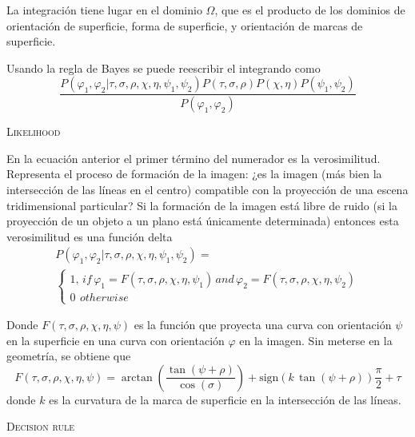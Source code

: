 \documentclass[a4paper,12pt]{article}
\begin{document}
La integración tiene lugar en el dominio $\Omega$, que es el producto de los dominios de orientación de superficie, forma de superficie, y orientación de marcas de superficie.

Usando la regla de Bayes se puede reescribir el integrando como
\begin{equation}
	\frac{
		P(
			\varphi_{1},\varphi_{2}
			|
			\tau,\sigma,\rho,\chi,\eta,\psi_{1},\psi_{2}
		)
		P(
		\tau,\sigma,\rho
		)
		P(
			\chi,\eta
		)
		P(
		\psi_{1},\psi_{2}
		)
	}{
	P(\varphi_{1}, \varphi_{2})
	}
\end{equation}

{\scshape Likelihood}

En la ecuación anterior el primer término del numerador es la verosimilitud. Representa el proceso de formación de la imagen: ¿es la imagen (más bien la intersección de las líneas en el centro) compatible con la proyección de una escena tridimensional particular? Si la formación de la imagen está libre de ruido (si la proyección de un objeto a un plano está únicamente determinada) entonces esta verosimilitud es una función delta
\begin{equation}
	\begin{array}{l}
		P(\varphi_{1}, \varphi_{2} | \tau,\sigma,\rho,\chi,\eta,\psi_{1},\psi_{2})
		=\\
		\left\{
		\begin{array}{l}
			1,\,if\,\varphi_{1} = F(\tau,\sigma,\rho,\chi,\eta,\psi_{1})\,and\,\varphi_{2} = F(\tau,\sigma,\rho,\chi,\eta,\psi_{2})\\
			0\,\ otherwise
		\end{array}
		\right.
	\end{array}
\end{equation}

Donde $F(\tau,\sigma,\rho,\chi,\eta,\psi)$ es la función que proyecta una curva con orientación $\psi$ en la superficie en una curva con orientación $\varphi$ en la imagen. Sin meterse en la geometría, se obtiene que
\begin{equation}
	F(\tau,\sigma,\rho,\chi,\eta,\psi)
	=
	\arctan\left(
		\frac{
			\tan(\psi + \rho)
		}{
		\cos(\sigma)
		}
	\right)
	+
	\mbox{sign}(k\,\tan(\psi + \rho)) \frac{\pi}{2} + \tau
\end{equation}
donde $k$ es la curvatura de la marca de superficie en la intersección de las líneas.

{\scshape Decision rule}
\end{document}
